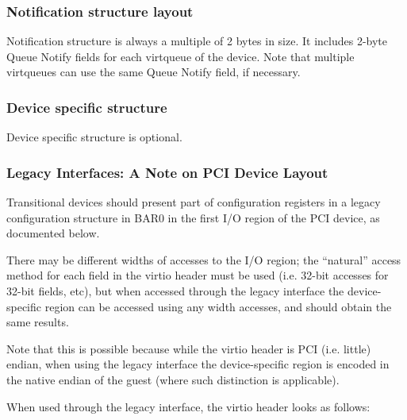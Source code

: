 \subsubsection{Notification structure layout}\label{sec:Virtio Transport Options / Virtio Over PCI Bus / PCI Device Layout / Notification structure layout}
Notification structure is always a multiple of 2 bytes in size.
It includes 2-byte Queue Notify fields for each virtqueue of
the device. Note that multiple virtqueues can use the same
Queue Notify field, if necessary.

\subsubsection{Device specific structure}\label{sec:Virtio Transport Options / Virtio Over PCI Bus / PCI Device Layout / Device specific structure}

Device specific structure is optional.

\subsubsection{Legacy Interfaces: A Note on PCI Device Layout}\label{sec:Virtio Transport Options / Virtio Over PCI Bus / PCI Device Layout / Legacy Interfaces: A Note on PCI Device Layout}

Transitional devices should present part of configuration
registers in a legacy configuration structure in BAR0 in the first I/O
region of the PCI device, as documented below.

There may be different widths of accesses to the I/O region; the
“natural” access method for each field in the virtio header must be
used (i.e. 32-bit accesses for 32-bit fields, etc), but 
when accessed through the legacy interface the
device-specific region can be accessed using any width accesses, and
should obtain the same results.

Note that this is possible because while the virtio header is PCI
(i.e. little) endian, when using the legacy interface the device-specific
region is encoded in the native endian of the guest (where such distinction is
applicable).

When used through the legacy interface, the virtio header looks as follows:

